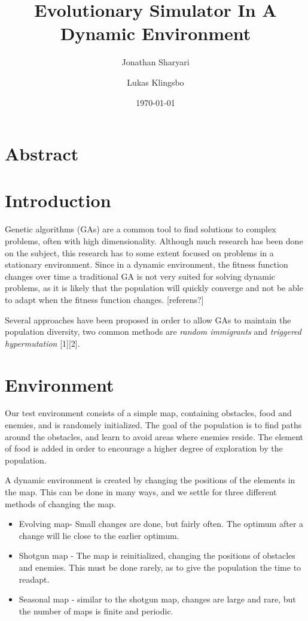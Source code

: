 \documentclass[a4paper,12pt]{article}
\title{\textbf{Evolutionary Simulator In A Dynamic Environment}}
\author{Jonathan Sharyari \and Lukas Klingsbo}  %
\date{\today}
\begin{document}
\maketitle

\section{Abstract}

\section{Introduction}
Genetic algorithms (GAs) are a common tool to find solutions to complex problems, often with high dimensionality. Although much research has been done on the subject, this research has to some extent focused on problems in a stationary environment. Since in a dynamic environment, the fitness function changes over time a traditional GA is not very suited for solving dynamic problems, as it is likely that the population will quickly converge and not be able to adapt when the fitness function changes. [referens?]

Several approaches have been proposed in order to allow GAs to maintain the population diversity, two common methods are \emph{random immigrants} and \emph{triggered hypermutation} [1][2].

\section{Environment}
Our test environment consists of a simple map, containing obstacles, food and enemies, and is randomely initialized. The goal of the population is to find paths around the obstacles, and learn to avoid areas where enemies reside. The element of food is added in order to encourage a higher degree of exploration by the population.

A dynamic environment is created by changing the positions of the elements in the map. This can be done in many ways, and we settle for three different methods of changing the map.

\begin{itemize}

\item
Evolving map- Small changes are done, but fairly often. The optimum after a change will lie close to the earlier optimum.
\item
Shotgun map - The map is reinitialized, changing the positions of obstacles and enemies. This must be done rarely, as to give the population the time to readapt.
\item
Seasonal map - similar to the shotgun map, changes are large and rare, but the number of maps is finite and periodic.
\end{itemize}
\end{document}
